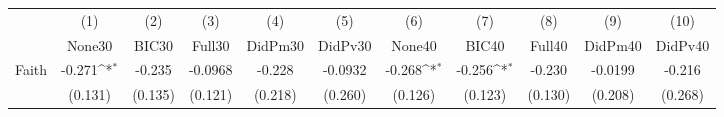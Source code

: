{
\def\sym#1{\ifmmode^{#1}\else\(^{#1}\)\fi}
\begin{tabular}{l*{10}{c}}
\toprule
            &\multicolumn{1}{c}{(1)}&\multicolumn{1}{c}{(2)}&\multicolumn{1}{c}{(3)}&\multicolumn{1}{c}{(4)}&\multicolumn{1}{c}{(5)}&\multicolumn{1}{c}{(6)}&\multicolumn{1}{c}{(7)}&\multicolumn{1}{c}{(8)}&\multicolumn{1}{c}{(9)}&\multicolumn{1}{c}{(10)}\\
            &\multicolumn{1}{c}{None30}&\multicolumn{1}{c}{BIC30}&\multicolumn{1}{c}{Full30}&\multicolumn{1}{c}{DidPm30}&\multicolumn{1}{c}{DidPv30}&\multicolumn{1}{c}{None40}&\multicolumn{1}{c}{BIC40}&\multicolumn{1}{c}{Full40}&\multicolumn{1}{c}{DidPm40}&\multicolumn{1}{c}{DidPv40}\\
\midrule
Faith       &      -0.271\sym{*}  &      -0.235         &     -0.0968         &      -0.228         &     -0.0932         &      -0.268\sym{*}  &      -0.256\sym{*}  &      -0.230         &     -0.0199         &      -0.216         \\
            &     (0.131)         &     (0.135)         &     (0.121)         &     (0.218)         &     (0.260)         &     (0.126)         &     (0.123)         &     (0.130)         &     (0.208)         &     (0.268)         \\
\bottomrule
\end{tabular}
}
